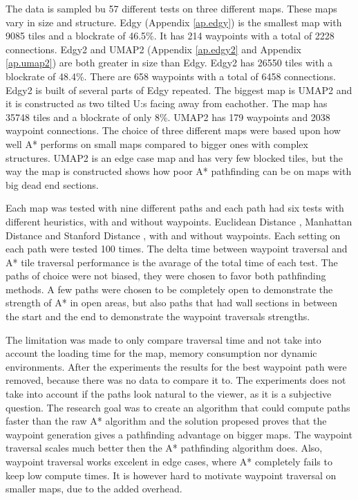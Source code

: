 \documentclass[sigconf]{acmart}
\begin{document}
The data is sampled bu 57 different tests on three different maps. These maps vary in size and structure. Edgy (Appendix \ref{ap.edgy}) is the smallest map with 9085 tiles and a blockrate of 46.5\%. It has 214 waypoints with a total of 2228 connections. Edgy2 and UMAP2 (Appendix \ref{ap.edgy2} and Appendix \ref{ap.umap2}) are both greater in size than Edgy. Edgy2 has 26550 tiles with a blockrate of 48.4\%. There are 658 waypoints with a total of 6458 connections. Edgy2 is built of several parts of Edgy repeated. The biggest map is UMAP2 and it is constructed as two tilted U:s facing away from eachother. The map has 35748 tiles and a blockrate of only 8\%. UMAP2 has 179 waypoints and 2038 waypoint connections. The choice of three different maps were based upon how well A* performs on small maps compared to bigger ones with complex structures. UMAP2 is an edge case map and has very few blocked tiles, but the way the map is constructed shows how poor A* pathfinding can be on maps with big dead end sections.
	
Each map was tested with nine different paths and each path had six tests with different heuristics, with and without waypoints. Euclidean Distance \cite{heuristicRef}, Manhattan Distance \cite{heuristicRef} and Stanford Distance \cite{heuristicRef}, with and without waypoints.
Each setting on each path were tested 100 times. The delta time between waypoint traversal and A* tile traversal performance is the avarage of the total time of each test. The paths of choice were not biased, they were chosen to favor both pathfinding methods. A few paths were chosen to be completely open to demonstrate the strength of A* in open areas, but also paths that had wall sections in between the start and the end to demonstrate the waypoint traversals strengths.

The limitation was made to only compare traversal time and not take into account the loading time for the map, memory consumption nor dynamic environments. After the experiments the results for the best waypoint path were removed, because there was no data to compare it to. The experiments does not take into account if the paths look natural to the viewer, as it is a subjective question. The research goal was to create an algorithm that could compute paths faster than the raw A* algorithm and the solution propesed proves that the waypoint generation gives a pathfinding advantage on bigger maps. The waypoint traversal scales much better then the A* pathfinding algorithm does. Also, waypoint traversal works excelent in edge cases, where A* completely fails to keep low compute times. It is however hard to motivate waypoint traversal on smaller maps, due to the added overhead.
\end{document}
